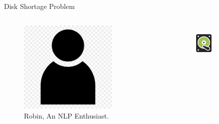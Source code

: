 \begin{frame}{Disk Shortage Problem}
     \begin{columns}
     \begin{figure}
         \centering
         \includegraphics[width=\textwidth, keepaspectratio]{attachments/vodro/person.png}
         \caption{Robin, An NLP Enthusiast.}
         \label{fig:nlp_man}
     \end{figure}
     \begin{columns}
     \end{columns}
     \begin{figure}
         \centering
         \begin{subfigure}{\textwidth}
            \includegraphics[width = .3\textwidth, keepaspectration]{attachments/vodro/hard_drive.png}
         \end{subfigure}

\end{figure}
\end{columns}
\end{frame}
